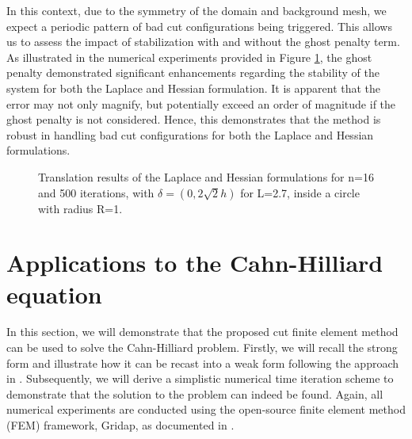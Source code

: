 \documentclass[11pt]{article}
\theoremstyle{remark}
\numberwithin{equation}{section}
\begin{document}
In this context, due to the symmetry of the domain and background mesh, we expect a periodic pattern of bad cut configurations being triggered. This allows us to assess the impact of stabilization with and without the ghost penalty
term. As illustrated in the numerical experiments provided in Figure \ref{fig:trans_lap_hes}, the ghost penalty demonstrated significant enhancements regarding the stability of the system for both the Laplace and Hessian
formulation. It is apparent that the error may not only magnify, but potentially exceed an order of magnitude if the ghost penalty is not considered. Hence, this demonstrates that the method is robust in handling bad cut configurations for both the Laplace and Hessian formulations.



\begin{figure}[h!]
\centering

\subfloat[Hessian]{%

}

\subfloat[Hessian]{%

}

\vspace{10pt}



\subfloat[Laplace ]{%

}

\subfloat[Laplace ]{%

}


\caption{Translation results of the Laplace and Hessian formulations for n=16 and 500 iterations, with $\delta = ( 0, 2\sqrt{2}h) $  for L=2.7, inside a circle with radius R=1.}

\label{fig:trans_lap_hes}
\end{figure}


\newpage
\section{Applications to the Cahn-Hilliard equation }%
\label{sec:cahn_hilliar_applications}

In this section, we will demonstrate that the proposed cut finite element method can be used to solve the Cahn-Hilliard problem. Firstly, we will recall the strong form and illustrate how it can be recast into a weak form following the approach in
\cite{feng2007fully}. Subsequently, we will derive a simplistic numerical time iteration scheme to demonstrate that the solution to the problem can indeed be found. Again, all numerical experiments are conducted using the open-source finite element method (FEM) framework, Gridap, as documented in \cite{verdugo22}.
\end{document}
